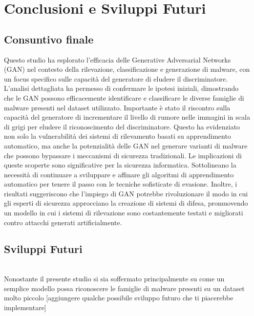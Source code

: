 \chapter{Conclusioni e Sviluppi Futuri}
\label{cap:conclusioni}
\section{Consuntivo finale}
Questo studio ha esplorato l'efficacia delle Generative Adversarial Networks (GAN) nel contesto della rilevazione, classificazione e generazione di malware, con un focus specifico sulle capacità del generatore di eludere il discriminatore. L'analisi dettagliata ha permesso di confermare le ipotesi iniziali, dimostrando che le GAN possono efficacemente identificare e classificare le diverse famiglie di malware presenti nel dataset utilizzato.
Importante è stato il riscontro sulla capacità del generatore di incrementare il livello di rumore nelle immagini in scala di grigi per eludere il riconoscimento del discriminatore. Questo ha evidenziato non solo la vulnerabilità dei sistemi di rilevamento basati su apprendimento automatico, ma anche la potenzialità delle GAN nel generare varianti di malware che possono bypassare i meccanismi di sicurezza tradizionali.
Le implicazioni di queste scoperte sono significative per la sicurezza informatica. Sottolineano la necessità di continuare a sviluppare e affinare gli algoritmi di apprendimento automatico per tenere il passo con le tecniche sofisticate di evasione. Inoltre, i risultati suggeriscono che l'impiego di GAN potrebbe rivoluzionare il modo in cui gli esperti di sicurezza approcciano la creazione di sistemi di difesa, promuovendo un modello in cui i sistemi di rilevazione sono costantemente testati e migliorati contro attacchi generati artificialmente.

\section{Sviluppi Futuri}
~\\
\indent Nonostante il presente studio si sia soffermato principalmente su come un semplice modello possa riconoscere le famiglie di malware presenti su un dataset molto piccolo
[aggiungere qualche possibile sviluppo futuro che ti piacerebbe implementare]


